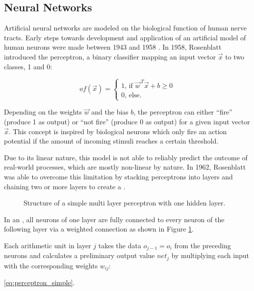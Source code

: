 	\subsection { Neural Networks }
	Artificial neural networks 	are modeled on the biological function of human nerve tracts.	Early steps towards development and application of an artificial model of human neurons were made between 1943 and 1958 \cite{McCulloch1943, ROSENBLATT1958}. In 1958, Rosenblatt introduced the perceptron, a binary classifier mapping an input vector $\vec{x}$ to two classes, 1 and 0:
	
	\begin{equation}
	\label{eq:rosenblatt-perceptron}ø
	f(\vec{x}) =
	\begin{cases}
	1\text{, if } \vec{w}^{\,T}\vec{x} + b \geq 0 \\
	0\text{, else.}
	\end{cases}
	\end{equation}
	
	Depending on the weights $\vec{w}$ and the bias $b$, the perceptron can either "`fire"' (produce 1 as output) or "`not fire"' (produce 0 as output) for a given input vector $\vec{x}$. This concept is inspired by biological neurons which only fire an action potential if the amount of incoming stimuli reaches a certain threshold.
	
	Due to its linear nature, this model is not able to reliably predict the outcome of real-world processes, which are mostly non-linear by nature. In 1962, Rosenblatt was able to overcome this limitation by stacking perceptrons into layers and chaining two or more layers to create a  \cite{ROSENBLATT1961}. 

		\begin{figure}
					
					\centering
			\caption{Structure of a simple multi layer perceptron with one hidden layer.}
			\label{fig:mlp}
		\end{figure}

		In an , all neurons of one layer are fully connected to every neuron of the following layer via a weighted connection as shown in Figure \ref{fig:mlp}.
		
		Each arithmetic unit in layer $j$ takes the data $o_{j-1} = o_i$ from the preceding neurons and calculates a preliminary output value $net_j$ by multiplying each input with the corresponding weights $w_{ij}$:
		
		 \ref{eq:perceptron_simple}. 
		
